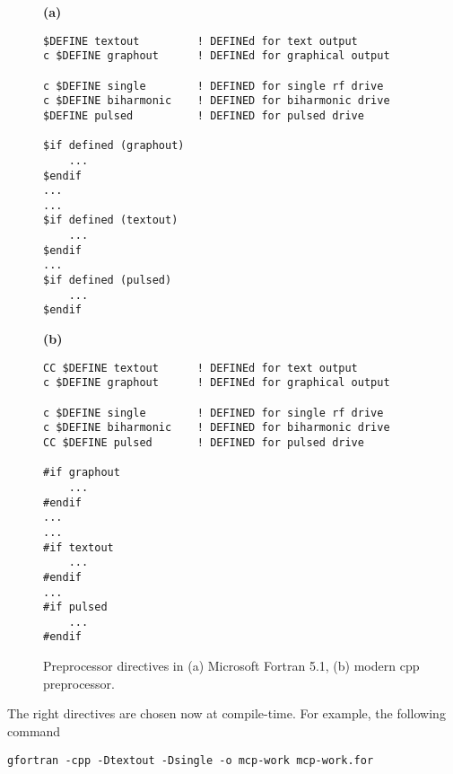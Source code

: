 \begin{figure}[b]
\centering

\begin{minipage}{0.48\textwidth}
\textbf{(a)}
\begin{lstlisting}
$DEFINE textout			! DEFINEd for text output
c $DEFINE graphout		! DEFINEd for graphical output

c $DEFINE single        ! DEFINED for single rf drive
c $DEFINE biharmonic    ! DEFINED for biharmonic drive
$DEFINE pulsed			! DEFINED for pulsed drive

$if defined (graphout)
	...
$endif
...
...
$if defined (textout)
	...
$endif
...
$if defined (pulsed)
	...
$endif
\end{lstlisting}
\end{minipage}
%
\hfill
%
\begin{minipage}{0.48\textwidth}
\textbf{(b)}
\begin{lstlisting}
CC $DEFINE textout		! DEFINEd for text output
c $DEFINE graphout		! DEFINEd for graphical output

c $DEFINE single        ! DEFINED for single rf drive
c $DEFINE biharmonic    ! DEFINED for biharmonic drive
CC $DEFINE pulsed		! DEFINED for pulsed drive

#if graphout
	...
#endif
...
...
#if textout
	...
#endif
...
#if pulsed
	...
#endif
\end{lstlisting}
\end{minipage}

\caption{Preprocessor directives in (a) Microsoft Fortran 5.1, (b) modern \textsf{cpp} preprocessor.}
\label{fig:preprocessor}
\end{figure}


The right directives are chosen now at compile-time. For example, the following command

\begin{lstlisting}
gfortran -cpp -Dtextout -Dsingle -o mcp-work mcp-work.for
\end{lstlisting}


